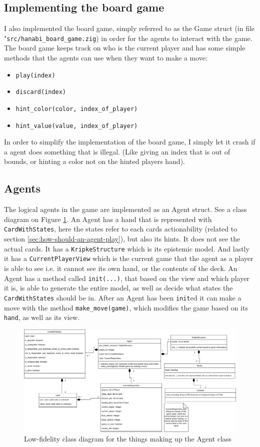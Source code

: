 \subsection{Implementing the board game}
I also implemented the board game, simply referred to as the Game struct (in file "{\tt src/hanabi\_board\_game.zig}) in order for the agents to interact with the game. The board game keeps track on who is the current player and has some simple methods that the agents can use when they want to make a move:

\begin{itemize}
	\item {\tt play(index)}
	\item {\tt discard(index)}
	\item {\tt hint\_color(color, index\_of\_player) }
	\item {\tt hint\_value(value, index\_of\_player) }
\end{itemize}
In order to simplify the implementation of the board game, I simply let it crash if a agent does something that is illegal. (Like giving an index that is out of bounds, or hinting a color not on the hinted players hand).


\subsection{Agents}
The logical agents in the game are implemented as an Agent struct. See a class diagram on Figure \ref{fig:Agent-class-diagram}.
An Agent has a hand that is represented with {\tt CardWithStates}, here the states refer to each cards actionability (related to section \ref{sec:how-should-an-agent-play}), but also its hints. It does not see the actual cards. It has a {\tt KripkeStructure} which is its epistemic model. And lastly it has a {\tt CurrentPlayerView} which is the current game that the agent as a player is able to see i.e. it cannot see its own hand, or the contents of the deck. An Agent has a method called {\tt init(...)}, that based on the view and which player it is, is able to generate the entire model, as well as decide what states the {\tt CardWithStates} should be in. After an Agent has been {\tt init}ed it can make a move with the method {\tt make\_move(game)}, which modifies the game based on its {\tt hand}, as well as its view.

\begin{figure}
\includegraphics[width=23cm]{images/agent-uml-class-diagram.png}
	\caption{Low-fidelity class diagram for the things making up the Agent class}
	\label{fig:Agent-class-diagram}
\end{figure}

